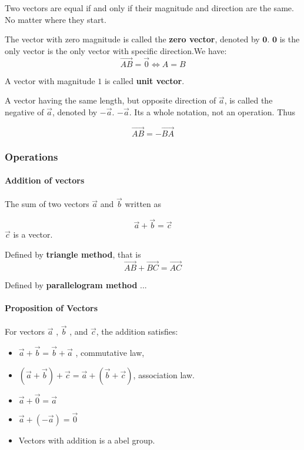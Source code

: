 \documentclass[UTF8]{ctexart}
\begin{document}
Two vectors are equal if and only if their magnitude and direction are the same. No matter where they start.

The vector with zero magnitude is called the \textbf{zero vector}, denoted by $\bm 0$. $\bm 0$ is the only vector is the only vector with specific direction.We have: 
$$
    \overrightarrow {AB}=\vec 0 \iff A=B
$$
  
A vector with magnitude $1$ is called \textbf{ unit vector}.
  
A vector having the same length, but opposite direction of $\vec a$, is called the negative of $\vec a$, denoted by $-\vec a$. $-\vec a$. Its a whole notation, not an operation. Thus 

 $$\overrightarrow  {AB}= - \overrightarrow  {BA}$$

\subsubsection{Operations}

\paragraph{Addition of vectors}

The sum of two vectors $\vec a$ and $\vec{b}$ written as

$$
\vec a +\vec b = \vec c
$$
$\vec c $ is a vector.


Defined by \textbf{triangle method}, that is
    $$
    \overrightarrow  {AB}+\overrightarrow  {BC}=\overrightarrow  {AC}
    $$

Defined by \textbf{parallelogram  method} ...

\paragraph{Proposition of Vectors}


For vectors $\vec a$ , $\vec b$ , and $\vec c$, the addition satisfies:

\begin{itemize}

\item $\vec a+\vec b =\vec b+\vec a $ , commutative law, 

\item $(\vec a+\vec b)+\vec c= \vec a+(\vec b+\vec c) $, association law.

\item $\vec a+\vec 0=\vec a$

\item $\vec a+(-\vec a)=\vec 0$

\item Vectors with addition is a abel group. 

\end{itemize}
\end{document}
